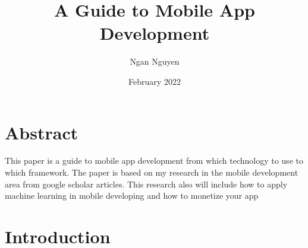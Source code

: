 \documentclass{article}
\title{ A Guide to Mobile App Development}
\author{Ngan Nguyen}
\date{February 2022}
\begin{document}
\maketitle

\section*{Abstract}
This paper is a guide to mobile app development from which technology to use to which framework. The paper is based on my research in the mobile development area from google scholar articles. This research also will include how to apply machine learning in mobile developing and how to monetize your app


\medskip

\section{Introduction}



\newpage
\end{document}
